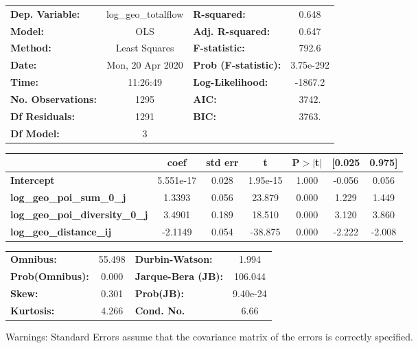 \begin{center}
\begin{tabular}{lclc}
\toprule
\textbf{Dep. Variable:}                 & log\_geo\_totalflow & \textbf{  R-squared:         } &     0.648   \\
\textbf{Model:}                         &         OLS         & \textbf{  Adj. R-squared:    } &     0.647   \\
\textbf{Method:}                        &    Least Squares    & \textbf{  F-statistic:       } &     792.6   \\
\textbf{Date:}                          &   Mon, 20 Apr 2020  & \textbf{  Prob (F-statistic):} & 3.75e-292   \\
\textbf{Time:}                          &       11:26:49      & \textbf{  Log-Likelihood:    } &   -1867.2   \\
\textbf{No. Observations:}              &          1295       & \textbf{  AIC:               } &     3742.   \\
\textbf{Df Residuals:}                  &          1291       & \textbf{  BIC:               } &     3763.   \\
\textbf{Df Model:}                      &             3       & \textbf{                     } &             \\
\bottomrule
\end{tabular}
\begin{tabular}{lcccccc}
                                        & \textbf{coef} & \textbf{std err} & \textbf{t} & \textbf{P$> |$t$|$} & \textbf{[0.025} & \textbf{0.975]}  \\
\midrule
\textbf{Intercept}                      &    5.551e-17  &        0.028     &  1.95e-15  &         1.000        &       -0.056    &        0.056     \\
\textbf{log\_geo\_poi\_sum\_0\_j}       &       1.3393  &        0.056     &    23.879  &         0.000        &        1.229    &        1.449     \\
\textbf{log\_geo\_poi\_diversity\_0\_j} &       3.4901  &        0.189     &    18.510  &         0.000        &        3.120    &        3.860     \\
\textbf{log\_geo\_distance\_ij}         &      -2.1149  &        0.054     &   -38.875  &         0.000        &       -2.222    &       -2.008     \\
\bottomrule
\end{tabular}
\begin{tabular}{lclc}
\textbf{Omnibus:}       & 55.498 & \textbf{  Durbin-Watson:     } &    1.994  \\
\textbf{Prob(Omnibus):} &  0.000 & \textbf{  Jarque-Bera (JB):  } &  106.044  \\
\textbf{Skew:}          &  0.301 & \textbf{  Prob(JB):          } & 9.40e-24  \\
\textbf{Kurtosis:}      &  4.266 & \textbf{  Cond. No.          } &     6.66  \\
\bottomrule
\end{tabular}
\end{center}

Warnings: \newline
 [1] Standard Errors assume that the covariance matrix of the errors is correctly specified.